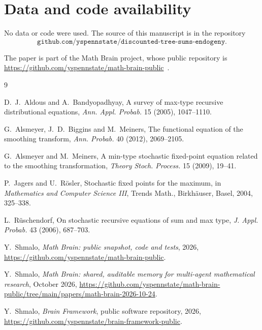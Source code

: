 \documentclass[11pt]{amsart}
\theoremstyle{remark}
\begin{document}
\section*{Data and code availability}

No data or code were used. The source of this manuscript is in the repository
\[
\texttt{github.com/yspennstate/discounted-tree-sums-endogeny}.
\]

The paper is part of the Math Brain project, whose public repository is \url{https://github.com/yspennstate/math-brain-public}~\cite{MathBrainRepo}.

\begin{thebibliography}{9}

D.~J.~Aldous and A.~Bandyopadhyay, A survey of max-type recursive distributional
equations, \emph{Ann. Appl. Probab.} 15 (2005), 1047--1110.

G.~Alsmeyer, J.~D.~Biggins and M.~Meiners, The functional equation of the smoothing
transform, \emph{Ann. Probab.} 40 (2012), 2069--2105.

G.~Alsmeyer and M.~Meiners, A min-type stochastic fixed-point equation related to the
smoothing transformation, \emph{Theory Stoch. Process.} 15 (2009), 19--41.

P.~Jagers and U.~R\"osler, Stochastic fixed points for the maximum, in
\emph{Mathematics and Computer Science III}, Trends Math., Birkh\"auser, Basel, 2004,
325--338.

L.~R\"uschendorf, On stochastic recursive equations of sum and max type, \emph{J. Appl.
Probab.} 43 (2006), 687--703.

 Y.~Shmalo, \emph{Math Brain: public snapshot, code and tests}, 2026, \url{https://github.com/yspennstate/math-brain-public}.

 Y.~Shmalo, \emph{Math Brain: shared, auditable memory for multi-agent mathematical research}, October 2026, \url{https://github.com/yspennstate/math-brain-public/tree/main/papers/math-brain-2026-10-24}.

 Y.~Shmalo, \emph{Brain Framework}, public software repository, 2026, \url{https://github.com/yspennstate/brain-framework-public}.

\end{thebibliography}
\end{document}
